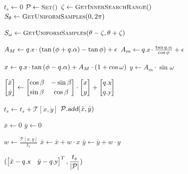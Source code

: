 \documentclass[12pt]{article}
\newcommand{\Function}[1]{\ensuremath{{\small \textsc{#1}}}}
\newcommand{\Var}[1]{\ensuremath{{\small{\textsl{#1}}}}}
\begin{document}
\begin{algorithm}[ht]

\caption{$\Function{GetDirection}(q, \beta, \phi, \mathcal{T})$}

\label{algo:2dplanning}

\begin{algorithmic}[1]

\setcounter{ALC@line}{0}

\vspace*{1mm}


\STATE $t_{s} \leftarrow 0$
\STATE $\mathcal{P} \leftarrow \Function{Set()}$
\STATE $\zeta \leftarrow \Function{GetInnerSearchRange}()$
\STATE $S_{\theta} \leftarrow \Function{GetUniformSamples}(0, 2 \pi)$


\STATE $S_{\omega} \leftarrow \Function{GetUniformSamples}(\theta - \zeta, \theta + \zeta)$


\STATE $A_{M} \leftarrow q.\Var{z} \cdot (\tan{(\phi + q.\alpha)} - \tan{\phi}) + \epsilon$
\STATE $A_{m} \leftarrow q.\Var{z} \cdot \frac{\tan{q.\alpha}}{\cos{\phi}} + \epsilon$

\STATE $x \leftarrow q.\Var{z} \cdot \tan{(\phi - q.\alpha)} + A_{M} \cdot (1 + \cos{\omega})$
\STATE $y \leftarrow A_{m} \cdot \sin{\omega}$

\STATE $\begin{bmatrix}
    \dot{x} \\[0.2em]
    \dot{y}
\end{bmatrix} \leftarrow \begin{bmatrix}
    \cos{\beta} & -\sin{\beta} \\[0.2em]
    \sin{\beta} & \cos{\beta}
\end{bmatrix} \cdot \begin{bmatrix}
    x \\[0.2em]
    y
\end{bmatrix} + \begin{bmatrix}
    q.\Var{x} \\[0.2em]
    q.\Var{y}
\end{bmatrix}$

\STATE $t_{s} \leftarrow t_{s} + \mathcal{T}[\dot{x}, \dot{y}]$
\STATE $\mathcal{P}.\Var{add}(\dot{x}, \dot{y})$

\ENDFOR

\ENDFOR

\STATE $\bar{x} \leftarrow 0$
\STATE $\bar{y} \leftarrow 0$


\STATE $w \leftarrow \frac{\mathcal{T}[x, y]}{t_{s}}$
\STATE $\bar{x} \leftarrow \bar{x} + w \cdot x$
\STATE $\bar{y} \leftarrow \bar{y} + w \cdot y$

\ENDFOR

\RETURN $(\begin{bmatrix}
    \bar{x} - q.\Var{x} & \bar{y} - q.\Var{y}
\end{bmatrix} ^ T, \mathlarger{\frac{t_s}{|\mathcal{P}|}})$

\end{algorithmic}
\end{algorithm}
\end{document}
